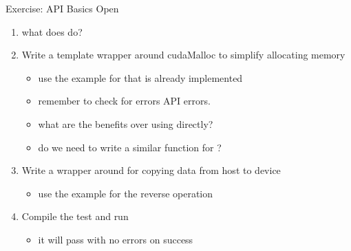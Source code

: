\begin{frame}[fragile]{Exercise: API Basics}
    Open 
    \begin{enumerate}
        \item what does  do?

        \item Write a template wrapper around cudaMalloc to simplify allocating memory
        \begin{itemize}
            \item use the example for  that is already implemented
            \item remember to check for errors API errors.
            \item what are the benefits over using  directly?
            \item do we need to write a similar function for ?
        \end{itemize}

        \item Write a wrapper around  for copying data from host to device
        \begin{itemize}
            \item use the example for the reverse operation 
        \end{itemize}

        \item Compile the test and run
        \begin{itemize}
            \item it will pass with no errors on success
        \end{itemize}
    \end{enumerate}

\end{frame}

